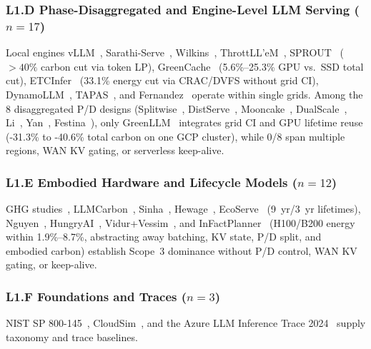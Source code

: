 \subsubsection{L1.D Phase-Disaggregated and Engine-Level LLM Serving (\texorpdfstring{$n=17$}{n=17})}
Local engines vLLM~\cite{kwon2023vllm}, Sarathi-Serve~\cite{agrawal2024sarathi}, Wilkins~\cite{wilkins2024offline}, ThrottLL'eM~\cite{kakolyris2025throttllem}, SPROUT~\cite{li2024sprout} ($>40\%$ carbon cut via token LP), GreenCache~\cite{tian2026greencache} (5.6\%--25.3\% GPU vs.\ SSD total cut), ETCInfer~\cite{lu2026etcinfer} (33.1\% energy cut via CRAC/DVFS without grid CI), DynamoLLM~\cite{stojkovic2025dynamollm}, TAPAS~\cite{stojkovic2025tapas}, and Fernandez~\cite{fernandez2025acl} operate within single grids. Among the 8 disaggregated P/D designs (Splitwise~\cite{patel2024splitwise}, DistServe~\cite{zhong2024distserve}, Mooncake~\cite{qin2025mooncake}, DualScale~\cite{basit2026dualscale}, Li~\cite{li2026revisiting}, Yan~\cite{yan2026pdprov}, Festina~\cite{wang2026festina}), only GreenLLM~\cite{shi2024greenllm} integrates grid CI and GPU lifetime reuse (-31.3\% to -40.6\% total carbon on one GCP cluster), while 0/8 span multiple regions, WAN KV gating, or serverless keep-alive.

\subsubsection{L1.E Embodied Hardware and Lifecycle Models (\texorpdfstring{$n=12$}{n=12})}
GHG studies~\cite{gupta2021chasing,gupta2022act,acun2023carbonexplorer,iso2024sci}, LLMCarbon~\cite{faiz2024llmcarbon}, Sinha~\cite{sinha2025utilization}, Hewage~\cite{hewage2025aging}, EcoServe~\cite{li2025ecoserve} (9~yr/3~yr lifetimes), Nguyen~\cite{nguyen2025sustainable}, HungryAI~\cite{jegham2025hungryai}, Vidur+Vessim~\cite{ozcan2025vidurvessim}, and InFactPlanner~\cite{tsiopani2026infactplanner} (H100/B200 energy within 1.9\%--8.7\%, abstracting away batching, KV state, P/D split, and embodied carbon) establish Scope~3 dominance without P/D control, WAN KV gating, or keep-alive.

\subsubsection{L1.F Foundations and Traces (\texorpdfstring{$n=3$}{n=3})}
NIST SP 800-145~\cite{mell2011nist}, CloudSim~\cite{calheiros2011cloudsim}, and the Azure LLM Inference Trace 2024~\cite{azure2024trace} supply taxonomy and trace baselines.

